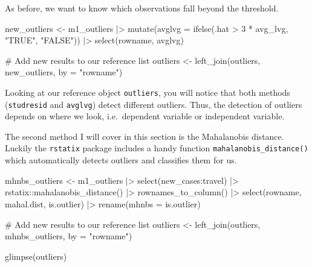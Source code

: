 \documentclass[
  letterpaper,
]{krantz}
\makeatletter
\newenvironment{Shaded}{\begin{snugshade}}{\end{snugshade}}
\newcommand{\AttributeTok}[1]{\textcolor[rgb]{0.40,0.45,0.13}{#1}}
\newcommand{\CommentTok}[1]{\textcolor[rgb]{0.37,0.37,0.37}{#1}}
\newcommand{\DecValTok}[1]{\textcolor[rgb]{0.68,0.00,0.00}{#1}}
\newcommand{\FunctionTok}[1]{\textcolor[rgb]{0.28,0.35,0.67}{#1}}
\newcommand{\NormalTok}[1]{\textcolor[rgb]{0.00,0.23,0.31}{#1}}
\newcommand{\OtherTok}[1]{\textcolor[rgb]{0.00,0.23,0.31}{#1}}
\newcommand{\SpecialCharTok}[1]{\textcolor[rgb]{0.37,0.37,0.37}{#1}}
\newcommand{\StringTok}[1]{\textcolor[rgb]{0.13,0.47,0.30}{#1}}
\newenvironment{kframe}{%
\medskip{}
\setlength{\fboxsep}{.8em}
 \def\at@end@of@kframe{}%
 \ifinner\ifhmode%
  \def\at@end@of@kframe{\end{minipage}}%
  \begin{minipage}{\columnwidth}%
 \fi\fi%
 \def\FrameCommand##1{\hskip\@totalleftmargin \hskip-\fboxsep
 \colorbox{shadecolor}{##1}\hskip-\fboxsep
     \hskip-\linewidth \hskip-\@totalleftmargin \hskip\columnwidth}%
 \MakeFramed {\advance\hsize-\width
   \@totalleftmargin\z@ \linewidth\hsize
   \@setminipage}}%
 {\par\unskip\endMakeFramed%
 \at@end@of@kframe}
\renewenvironment{Shaded}{\begin{kframe}}{\end{kframe}}
\makeatother
\begin{document}
As before, we want to know which observations fall beyond the threshold.

\begin{Shaded}
\begin{Highlighting}[]
\NormalTok{new\_outliers }\OtherTok{\textless{}{-}}
\NormalTok{  m1\_outliers }\SpecialCharTok{|\textgreater{}}
  \FunctionTok{mutate}\NormalTok{(}\AttributeTok{avglvg =} \FunctionTok{ifelse}\NormalTok{(.hat }\SpecialCharTok{\textgreater{}} \DecValTok{3} \SpecialCharTok{*}\NormalTok{ avg\_lvg, }\StringTok{"TRUE"}\NormalTok{, }\StringTok{"FALSE"}\NormalTok{)) }\SpecialCharTok{|\textgreater{}}
  \FunctionTok{select}\NormalTok{(rowname, avglvg)}

\CommentTok{\# Add new results to our reference list}
\NormalTok{outliers }\OtherTok{\textless{}{-}} \FunctionTok{left\_join}\NormalTok{(outliers, new\_outliers, }\AttributeTok{by =} \StringTok{"rowname"}\NormalTok{)}
\end{Highlighting}
\end{Shaded}

Looking at our reference object \texttt{outliers}, you will notice that
both methods (\texttt{studresid} and \texttt{avglvg}) detect different
outliers. Thus, the detection of outliers depends on where we look,
i.e.~dependent variable or independent variable.

The second method I will cover in this section is the Mahalanobis
distance. Luckily the \texttt{rstatix} package includes a handy function
\texttt{mahalanobis\_distance()} which automatically detects outliers
and classifies them for us.

\begin{Shaded}
\begin{Highlighting}[]
\NormalTok{mhnbs\_outliers }\OtherTok{\textless{}{-}}
\NormalTok{  m1\_outliers }\SpecialCharTok{|\textgreater{}}
  \FunctionTok{select}\NormalTok{(new\_cases}\SpecialCharTok{:}\NormalTok{travel) }\SpecialCharTok{|\textgreater{}}
\NormalTok{  rstatix}\SpecialCharTok{::}\FunctionTok{mahalanobis\_distance}\NormalTok{() }\SpecialCharTok{|\textgreater{}}
  \FunctionTok{rownames\_to\_column}\NormalTok{() }\SpecialCharTok{|\textgreater{}}
  \FunctionTok{select}\NormalTok{(rowname, mahal.dist, is.outlier) }\SpecialCharTok{|\textgreater{}}
  \FunctionTok{rename}\NormalTok{(}\AttributeTok{mhnbs =}\NormalTok{ is.outlier)}

\CommentTok{\# Add new results to our reference list}
\NormalTok{outliers }\OtherTok{\textless{}{-}} \FunctionTok{left\_join}\NormalTok{(outliers, mhnbs\_outliers, }\AttributeTok{by =} \StringTok{"rowname"}\NormalTok{)}

\FunctionTok{glimpse}\NormalTok{(outliers)}
\end{Highlighting}
\end{Shaded}
\end{document}
